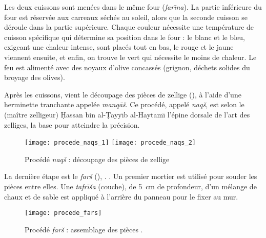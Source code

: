 Les deux cuissons sont menées dans le même four (\emph{far\={\i}na}). 
La partie inférieure du four est réservée aux carreaux séchés au 
soleil, alors que la seconde cuisson se déroule dans la partie 
supérieure. Chaque couleur nécessite une température de cuisson 
spécifique qui détermine sa position dans le four : le blanc et 
le bleu, exigeant une chaleur intense, sont placés tout en bas, le 
rouge et le jaune viennent ensuite, et enfin, on trouve le vert qui 
nécessite le moins de chaleur. Le feu est alimenté avec des noyaux 
d'olive concassés (grignon, déchets solides du broyage des olives).

Après les cuissons, vient le découpage des pièces de zellige 
(), à l'aide d'une herminette tranchante 
appelée \emph{manq\={a}\v{s}}. Ce procédé, appelé \emph{naq\v{s}}, 
est selon le \zlaygi (maître zelligeur) \d{H}assan bin 
al-\d{T}ayy\={\i}b al-Haytam\={\i} l'épine dorsale de l'art des 
zelliges, la base pour atteindre la précision.

\begin{figure}[htb]
  \texttt{[image: procede\_naqs\_1]}%
  \quad%
  \texttt{[image: procede\_naqs\_2]}
  \caption[Procédé \emph{naq\v{s}} : découpage des pièces de zellige]
          {Procédé \emph{naq\v{s}} : découpage des pièces de zellige 
           \autocite{Castera_1996}}
  \label{fig:procede_naqs}
\end{figure}

La dernière étape est le \emph{far\v{s}} (), 
. \autocite{Damluji_1993a}.
Un premier mortier est utilisé pour souder les pièces entre elles. 
Une \emph{tafr\={\i}\v{s}a} (couche), de \SI{5}{\cm} de profondeur, 
d'un mélange de chaux et de sable est appliqué à l'arrière du panneau 
pour le fixer au mur.

\begin{figure}[htb]
  \texttt{[image: procede\_fars]}%
  \caption{Procédé \emph{far\v{s}} : assemblage des pièces 
           \autocite{Castera_1996}.}
  \label{fig:procede_fars}
\end{figure}


